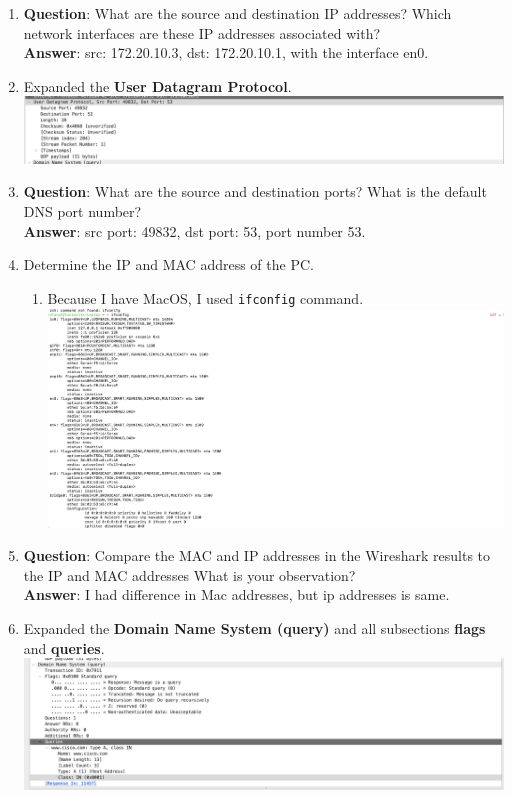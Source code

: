 \documentclass[12pt]{article}
\begin{document}
\begin{enumerate}
    \item \textbf{Question}: What are the source and destination IP addresses? Which network interfaces are these IP addresses associated with?  \\
    \textbf{Answer}: src: 172.20.10.3, dst: 172.20.10.1, with the interface en0.\\
    \item Expanded the \textbf{User Datagram Protocol}. \\
    \includegraphics[width=.7\textwidth]{Image14.png} 
    \item \textbf{Question}: What are the source and destination ports? What is the default DNS port number? \\
    \textbf{Answer}: src port: 49832, dst port: 53, port number 53.\\
    \newpage
    \item Determine the IP and MAC address of the PC. 
    \begin{enumerate}
        \item Because I have MacOS, I used \texttt{ifconfig} command. \\
        \includegraphics[width=.7\textwidth]{Image15.png}
    \end{enumerate}
    \item \textbf{Question}: Compare the MAC and IP addresses in the Wireshark results to the IP and MAC addresses What is your observation? \\
    \textbf{Answer}: I had difference in Mac addresses, but ip addresses is same.
    \item Expanded the \textbf{Domain Name System (query)} and all subsections \textbf{flags} and \textbf{queries}. \\
    \includegraphics[width=.7\textwidth]{Image16.png}
\end{enumerate}
\end{document}
